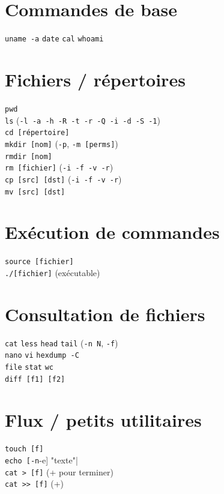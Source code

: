 \documentclass[10pt]{article}
\begin{document}
\begin{multicols}{4}
\section*{Commandes de base}
\lstinline|uname -a| \quad
\lstinline|date| \quad
\lstinline|cal| \quad
\lstinline|whoami| \\

\section*{Fichiers / répertoires}
\lstinline|pwd| \\
\lstinline|ls| (\lstinline|-l -a -h -R -t -r -Q -i -d -S -1|) \\
\lstinline|cd [répertoire]| \\
\lstinline|mkdir [nom]| (\lstinline|-p|, \lstinline|-m [perms]|) \\
\lstinline|rmdir [nom]| \\
\lstinline|rm [fichier]| (\lstinline|-i -f -v -r|) \\
\lstinline|cp [src] [dst]| (\lstinline|-i -f -v -r|) \\
\lstinline|mv [src] [dst]| \\

\section*{Exécution de commandes}
\lstinline|source [fichier]| \\
\lstinline|./[fichier]| (exécutable) \\

\section*{Consultation de fichiers}
\lstinline|cat| \quad
\lstinline|less| \quad
\lstinline|head| \quad
\lstinline|tail| (\lstinline|-n N|, \lstinline|-f|) \\
\lstinline|nano| \quad \lstinline|vi| \quad \lstinline|hexdump -C| \\
\lstinline|file| \quad \lstinline|stat| \quad \lstinline|wc| \\
\lstinline|diff [f1] [f2]| \\

\section*{Flux / petits utilitaires}
\lstinline|touch [f]| \\
\lstinline|echo [-n|-e] "texte"| \\
\lstinline|cat > [f]| (\keys{\ctrl}+ pour terminer) \\
\lstinline|cat >> [f]| (\keys{\ctrl}+) \\


\end{multicols}
\end{document}
